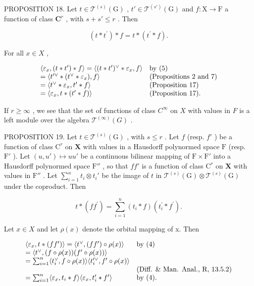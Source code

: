 PROPOSITION 18. Let \(t \in \mathcal{T}^{(s)}(\mathrm{G})\) , \(t' \in \mathcal{T}^{(s')}(\mathrm{G})\) and \(f: \mathrm{X} \to \mathrm{F}\) a function of class \(\mathbf{C}^r\) , with \(s + s' \leqslant r\) . Then

\[
(t * t ^ {\prime}) * f = t * (t ^ {\prime} * f).
\]

For all \(x \in X\) ,

\[
\begin{array}{l l} \langle \varepsilon_ {x}, (t * t ^ {\prime}) * f \rangle = \langle (t * t ^ {\prime}) ^ {\vee} * \varepsilon_ {x}, f \rangle & \text {by (5)} \\ = \langle t ^ {\prime \vee} * (t ^ {\vee} * \varepsilon_ {x}), f \rangle & \text {(Propositions 2 and 7)} \\ = \langle t ^ {\vee} * \varepsilon_ {x}, t ^ {\prime} * f \rangle & \text {(Proposition 17)} \\ = \langle \varepsilon_ {x}, t * (t ^ {\prime} * f) \rangle & \text {(Proposition 17).} \end{array}
\]

If \(r \geqslant \infty\) , we see that the set of functions of class \(C^\infty\) on \(X\) with values in \(F\) is a left module over the algebra \(\mathcal{T}^{(\infty)}(G)\) .

PROPOSITION 19. Let \(t \in \mathcal{T}^{(s)}(\mathrm{G})\) , with \(s \leqslant r\) . Let \(f\) (resp. \(f'\) ) be a function of class \(\mathrm{C}^r\) on \(\mathbf{X}\) with values in a Hausdorff polynormed space \(\mathrm{F}\) (resp. \(\mathrm{F}'\) ). Let \((u, u') \mapsto uu'\) be a continuous bilinear mapping of \(\mathrm{F} \times \mathrm{F}'\) into a Hausdorff polynormed space \(\mathrm{F}''\) , so that \(ff'\) is a function of class \(\mathrm{C}^r\) on \(\mathbf{X}\) with values in \(\mathrm{F}''\) . Let \(\sum_{i=1}^{n} t_i \otimes t_i'\) be the image of \(t\) in \(\mathcal{T}^{(s)}(\mathrm{G}) \otimes \mathcal{T}^{(s)}(\mathrm{G})\) under the coproduct. Then

\[
t * (f f ^ {\prime}) = \sum_ {i = 1} ^ {n} (t _ {i} * f) (t _ {i} ^ {\prime} * f ^ {\prime}).
\]

Let \(x \in X\) and let \(\rho(x)\) denote the orbital mapping of x. Then

\[
\begin{array}{l l} \langle \varepsilon_ {x}, t * (f f ^ {\prime}) \rangle = \langle t ^ {\vee}, (f f ^ {\prime}) \circ \rho (x) \rangle & \text {by (4)} \\ = \langle t ^ {\vee}, (f \circ \rho (x)) (f ^ {\prime} \circ \rho (x)) \rangle \\ = \sum_ {i = 1} ^ {n} \langle t _ {i} ^ {\vee}, f \circ \rho (x) \rangle \langle t _ {i} ^ {\prime \vee}, f ^ {\prime} \circ \rho (x) \rangle \\ & (\text {Diff. \& Man. Anal., R, 13.5.2}) \\ = \sum_ {i = 1} ^ {n} \langle \varepsilon_ {x}, t _ {i} * f \rangle \langle \varepsilon_ {x}, t _ {i} ^ {\prime} * f ^ {\prime} \rangle & \text {by (4).} \end{array}
\]

